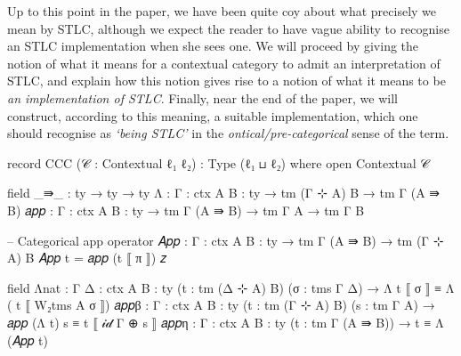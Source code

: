 Up to this point in the paper, we have been quite coy about what precisely we
mean by STLC, although we expect the reader to have vague ability to recognise
an STLC implementation when she sees one. We will proceed by giving the notion
of what it means for a contextual category to admit an interpretation of STLC,
and explain how this notion gives rise to a notion of what it means to be
\emph{an implementation of STLC}. Finally, near the end of the paper, we will
construct, according to this meaning, a suitable implementation, which one
should recognise as \emph{`being STLC'} in the \emph{ontical/pre-categorical}
sense of the term.

\begin{code}
record CCC (𝒞 : Contextual ℓ₁ ℓ₂) : Type (ℓ₁ ⊔ ℓ₂) where
  open Contextual 𝒞

  field
    _⇛_ : ty → ty → ty
    Λ : {Γ : ctx} {A B : ty} → tm (Γ ⊹ A) B → tm Γ (A ⇛ B)
    𝑎𝑝𝑝 : {Γ : ctx} {A B : ty} → tm Γ (A ⇛ B) → tm Γ A → tm Γ B

  -- Categorical app operator
  𝐴𝑝𝑝 : {Γ : ctx} {A B : ty} → tm Γ (A ⇛ B) → tm (Γ ⊹ A) B
  𝐴𝑝𝑝 t = 𝑎𝑝𝑝 (t ⟦ π ⟧) 𝑧

  field
    Λnat : {Γ Δ : ctx} {A B : ty} (t : tm (Δ ⊹ A) B) (σ : tms Γ Δ) →
      Λ t ⟦ σ ⟧ ≡  Λ ( t ⟦ W₂tms A σ ⟧)
    𝑎𝑝𝑝β : {Γ : ctx} {A B : ty} (t : tm (Γ ⊹ A) B) (s : tm Γ A) →
      𝑎𝑝𝑝 (Λ t) s ≡ t ⟦ 𝒾𝒹 Γ ⊕ s ⟧
    𝑎𝑝𝑝η : {Γ : ctx} {A B : ty} (t : tm Γ (A ⇛ B)) →
      t ≡ Λ (𝐴𝑝𝑝 t)
\end{code}

